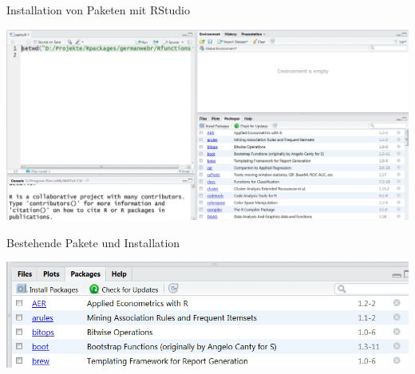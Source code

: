 \documentclass[ignorenonframetext,]{beamer}
\begin{document}
\begin{frame}{Installation von Paketen mit RStudio}
\protect\hypertarget{installation-von-paketen-mit-rstudio}{}

\includegraphics{figure/PaketeRstudio.PNG}

\end{frame}

\begin{frame}{Bestehende Pakete und Installation}
\protect\hypertarget{bestehende-pakete-und-installation}{}

\includegraphics{figure/packages3.PNG}

\end{frame}
\end{document}
